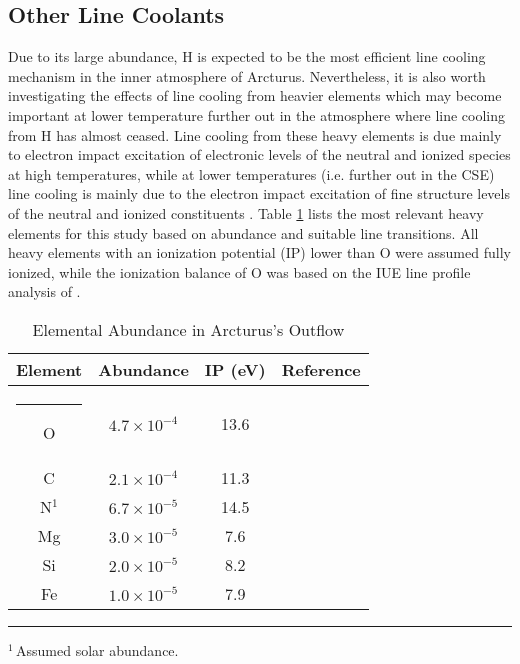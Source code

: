 \subsection{Other Line Coolants}\label{sec:7.3.4}
Due to its large abundance, H is expected to be the most efficient line cooling mechanism in the inner atmosphere of Arcturus. Nevertheless, it is also worth investigating the effects of line cooling from heavier elements which may become important at lower temperature further out in the atmosphere where line cooling from H has almost ceased. Line cooling from these heavy elements is due mainly to electron impact excitation of electronic levels of the neutral and ionized species at high temperatures, while at lower temperatures (i.e. further out in the CSE) line cooling is mainly due to the electron impact excitation of fine structure levels of the neutral and ionized constituents \citep{dalgarno_1972}. Table \ref{tab:7.1} lists the most relevant heavy elements for this study based on abundance and suitable line transitions. All heavy elements with an ionization potential (IP) lower than O were assumed fully ionized,  while the ionization balance of O was based on the IUE line profile analysis of \cite{judge_1986}.

\begin{table}[!ht]
\begin{center}
\caption[]{Elemental Abundance in Arcturus's Outflow}
\begin{tabular}{cccc}
\hline
\hline
\rule{0pt}{2.5ex} Element & Abundance & IP (eV) & Reference \\
\hline
\rule{-2.5pt}{2.5ex}	O &  $4.7\times 10^{-4}$ & 13.6 & \cite{ramirez_2011}\\
					C &  $2.1\times 10^{-4}$ & 11.3 & \cite{ramirez_2011}\\
					N$^{1}$ &  $6.7\times 10^{-5}$& 14.5 & \cite{asplund_2009}\\
					Mg & $3.0\times 10^{-5}$ & 7.6 & \cite{ramirez_2011}\\
					Si & $2.0\times 10^{-5}$ & 8.2 & \cite{ramirez_2011}\\
					Fe & $1.0\times 10^{-5}$ & 7.9 & \cite{decin_2003}\\
\hline
\end{tabular}
\label{tab:7.1}
\begin{minipage}{12.5cm}
\rule{-2.5pt}{2.5ex}{\footnotesize $^{1}$\,Assumed solar abundance.}
\end{minipage}
\end{center}
\end{table}

